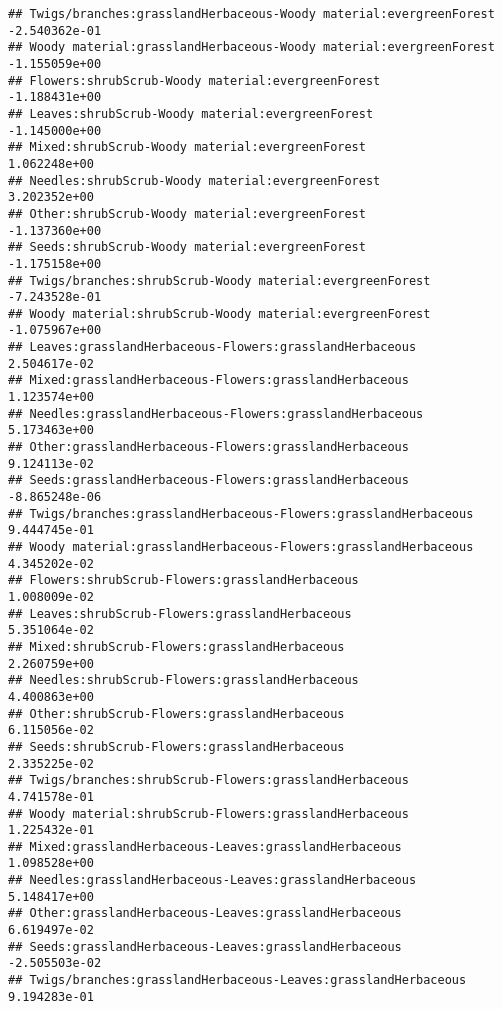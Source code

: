 \documentclass[
]{article}
\begin{document}
\begin{verbatim}
## Twigs/branches:grasslandHerbaceous-Woody material:evergreenForest     -2.540362e-01
## Woody material:grasslandHerbaceous-Woody material:evergreenForest     -1.155059e+00
## Flowers:shrubScrub-Woody material:evergreenForest                     -1.188431e+00
## Leaves:shrubScrub-Woody material:evergreenForest                      -1.145000e+00
## Mixed:shrubScrub-Woody material:evergreenForest                        1.062248e+00
## Needles:shrubScrub-Woody material:evergreenForest                      3.202352e+00
## Other:shrubScrub-Woody material:evergreenForest                       -1.137360e+00
## Seeds:shrubScrub-Woody material:evergreenForest                       -1.175158e+00
## Twigs/branches:shrubScrub-Woody material:evergreenForest              -7.243528e-01
## Woody material:shrubScrub-Woody material:evergreenForest              -1.075967e+00
## Leaves:grasslandHerbaceous-Flowers:grasslandHerbaceous                 2.504617e-02
## Mixed:grasslandHerbaceous-Flowers:grasslandHerbaceous                  1.123574e+00
## Needles:grasslandHerbaceous-Flowers:grasslandHerbaceous                5.173463e+00
## Other:grasslandHerbaceous-Flowers:grasslandHerbaceous                  9.124113e-02
## Seeds:grasslandHerbaceous-Flowers:grasslandHerbaceous                 -8.865248e-06
## Twigs/branches:grasslandHerbaceous-Flowers:grasslandHerbaceous         9.444745e-01
## Woody material:grasslandHerbaceous-Flowers:grasslandHerbaceous         4.345202e-02
## Flowers:shrubScrub-Flowers:grasslandHerbaceous                         1.008009e-02
## Leaves:shrubScrub-Flowers:grasslandHerbaceous                          5.351064e-02
## Mixed:shrubScrub-Flowers:grasslandHerbaceous                           2.260759e+00
## Needles:shrubScrub-Flowers:grasslandHerbaceous                         4.400863e+00
## Other:shrubScrub-Flowers:grasslandHerbaceous                           6.115056e-02
## Seeds:shrubScrub-Flowers:grasslandHerbaceous                           2.335225e-02
## Twigs/branches:shrubScrub-Flowers:grasslandHerbaceous                  4.741578e-01
## Woody material:shrubScrub-Flowers:grasslandHerbaceous                  1.225432e-01
## Mixed:grasslandHerbaceous-Leaves:grasslandHerbaceous                   1.098528e+00
## Needles:grasslandHerbaceous-Leaves:grasslandHerbaceous                 5.148417e+00
## Other:grasslandHerbaceous-Leaves:grasslandHerbaceous                   6.619497e-02
## Seeds:grasslandHerbaceous-Leaves:grasslandHerbaceous                  -2.505503e-02
## Twigs/branches:grasslandHerbaceous-Leaves:grasslandHerbaceous          9.194283e-01

\end{verbatim}
\end{document}
